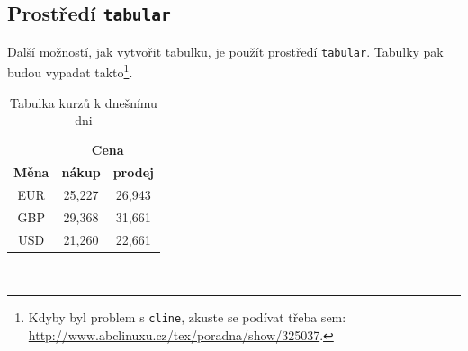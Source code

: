 \documentclass[a4paper, 11pt]{article}
\begin{document}
\subsection{Prostředí \enspace\texttt{tabular}}
Další možností, jak vytvořit tabulku, je použít prostředí \enspace\texttt{tabular}. Tabulky pak budou vypadat takto\footnote[1]{Kdyby byl problem s \enspace\texttt{cline},
zkuste se podívat třeba sem: \href{http://www.abclinuxu.cz/tex/poradna/show/325037}{http://www.abclinuxu.cz/tex/poradna/show/325037}.}. \\
\smallskip
\begin{table}[h]
    \centering
    \begin{tabular}{|c|c|c|}
    \hline
     & \multicolumn{2}{c|}{\textbf{Cena}} \\ \cline{2-3}
    \textbf{Měna} & \textbf{nákup} & \textbf{prodej} \\ \hline
    EUR & 25,227 & 26,943 \\
    GBP & 29,368 & 31,661 \\
    USD & 21,260 & 22,661 \\ \hline
    \end{tabular} \\
    \caption{\label{tab:tab1}Tabulka kurzů k dnešnímu dni}
\end{table}
\bigskip
\end{document}

